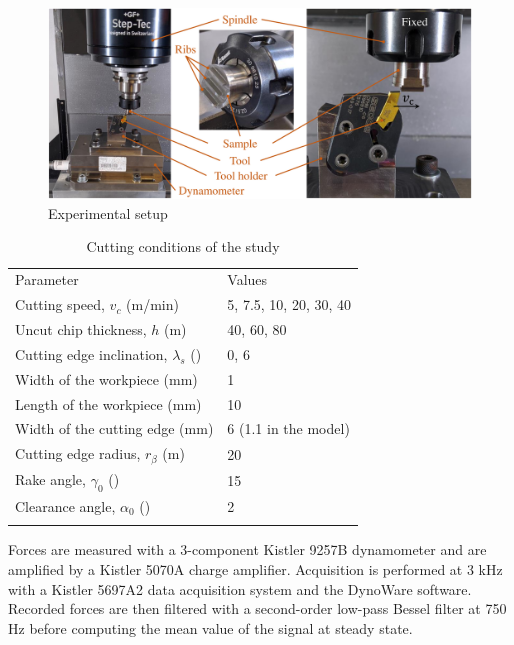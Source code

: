 \documentclass[preprint,12pt,times]{elsarticle}
\begin{document}
\begin{figure}[!h]
\centering
\includegraphics[width = 140 mm]{Figures/ExpSetup} %
\caption{Experimental setup}
\label{ExpSetup}
\end{figure}

%
\begin{table}[!h]
\begin{center}
\caption{\label{tab:CutCond} Cutting conditions of the study}
\begin{tabular}{ll}
\hline\noalign{\smallskip}
Parameter  & Values\\
\noalign{\smallskip}\hline\noalign{\smallskip}
Cutting speed, $v_c$ (m/min) & 5, 7.5, 10, 20, 30, 40\\
Uncut chip thickness, $h$ (\textmu{}m) & 40, 60, 80\\
Cutting edge inclination, $\lambda_s$ (\textdegree{}) & 0, 6\\
Width of the workpiece (mm) & 1\\
Length of the workpiece (mm) & 10\\
Width of the cutting edge (mm) & 6 (1.1 in the model)\\
Cutting edge radius, $r_\beta$ (\textmu{}m) & 20\\
Rake angle, $\gamma_0$ (\textdegree{}) & 15\\
Clearance angle, $\alpha_0$ (\textdegree{}) & 2\\
\noalign{\smallskip}\hline
\end{tabular}
\end{center}
\end{table}
%

Forces are measured with a 3-component Kistler 9257B dynamometer and are amplified by a Kistler 5070A charge amplifier. Acquisition is performed at 3 kHz with a Kistler 5697A2 data acquisition system and the DynoWare software. Recorded forces are then filtered with a second-order low-pass Bessel filter at 750 Hz before computing the mean value of the signal at steady state.
\end{document}
